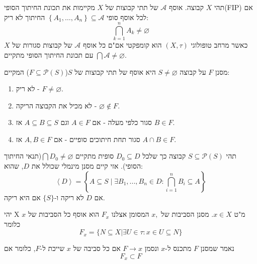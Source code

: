 \documentclass{tstextbook}
\begin{document}
\begin{reminder}
תהי \(X\) קבוצה. אוסף \(\mathcal{A}\) של תתי קבוצות של \(X\) מקיימות את תכונת החיתוך הסופי(FIP) אם לכל אוסף סופי \(\left\{  A_{1},\dots,A_{n}  \right\}\subseteq \mathcal{A}\) החיתוך לא ריק:
$$\bigcap_{k=1}^{n}A_{k}\neq \varnothing $$
כאשר מרחב טופולוגי \(\left( X,\tau \right)\) הוא קומפקטי אם"ם כל אוסף \(\mathcal{A}\) של קבוצות סגורות של \(X\) עם תכונת החיתוך הסופי מתקיים \(\bigcap \mathcal{A}\neq \varnothing\).

\end{reminder}
\begin{definition}[מסנן]
מסנן \(F\) על קבוצה \(S\neq \varnothing\) היא אוסף של תתי קבוצות של \(S\)(\(F\subseteq \mathcal{P}(S)\)) המקיים:

  \begin{enumerate}
    \item לא ריק - \(F \neq \varnothing\). 


    \item לא מכיל את הקבוצה הריקה - \(\varnothing \not\in F\). 


    \item סגור כלפי מעלה - אם \(A \in F\) וגם \(A\subseteq B \subseteq S\) אז \(B\in F\). 


    \item סגור תחת חיתוכים סופיים - אם \(A,B \in F\) אז \(A\cap B \in F\). 


  \end{enumerate}
\end{definition}
\begin{proposition}
תהי \(S\subseteq \mathcal{P}(S)\) קבוצה כך שלכל \(D_{0} \subseteq D\) סופית מתקיים \(\bigcap D_{0} \neq \varnothing\)(תנאי החיתוך הסופי). אזי קיים מסנן מינמלי שכולל את \(D\), שהוא:
$$\left\langle D\right\rangle=\left\{A\subseteq S\mid\exists B_{1},...,B_{n}\in D:\bigcap_{i=1}^{n}B_{i}\subseteq A\right\}$$
אם \(D\) לא ריקה ו-\(\{ S \}\) אם היא ריקה.

\end{proposition}
\begin{definition}
יהי X מ"ט \(x\in X\). מסנן הסביבות של \(x,\) המסומן אצלנו \(F_{x}\) הוא אוסף כל הסביבות של \(x\) כלומר
$$F_{x}=\{N\subseteq X|\exists U\in\tau:x\in U\subseteq N\}$$

\end{definition}
\begin{definition}
נאמר שמסנן \(F\) מתכנס ל-\(x\) ונסמן \(F\rightarrow x\) אם כל סביבה של \(x\) שייכת ל-\(F\), כלומר אם
$$F_{x}\subset F$$

\end{definition}
\end{document}
